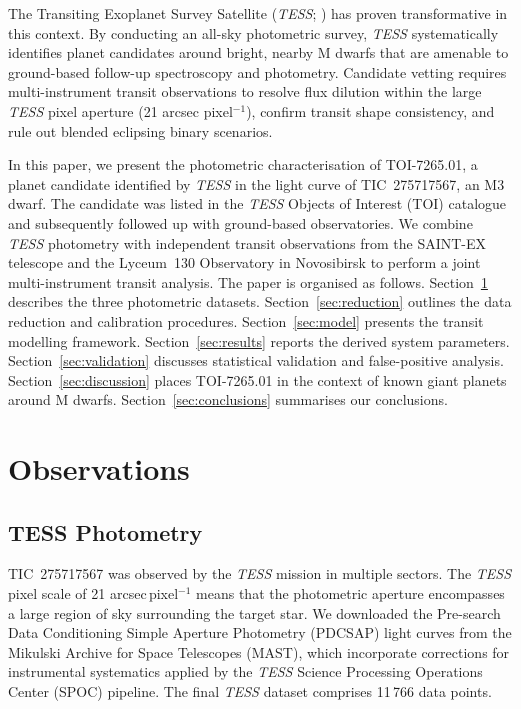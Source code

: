 \documentclass[fleqn,usenatbib]{mnras}
\newcommand{\SAINTEX}{SAINT-EX}
\begin{document}
The Transiting Exoplanet Survey Satellite (\textit{TESS}; \citealt{ricker2015}) has proven transformative in this context. By conducting an all-sky photometric survey, \textit{TESS} systematically identifies planet candidates around bright, nearby M dwarfs that are amenable to ground-based follow-up spectroscopy and photometry. Candidate vetting requires multi-instrument transit observations to resolve flux dilution within the large \textit{TESS} pixel aperture (21 arcsec pixel$^{-1}$), confirm transit shape consistency, and rule out blended eclipsing binary scenarios.

In this paper, we present the photometric characterisation of TOI-7265.01, a planet candidate identified by \textit{TESS} in the light curve of TIC~275717567, an M3 dwarf. The candidate was listed in the \textit{TESS} Objects of Interest (TOI) catalogue \citep{guerrero2021} and subsequently followed up with ground-based observatories. We combine \textit{TESS} photometry with independent transit observations from the \SAINTEX{} telescope \citep{demory2020} and the Lyceum~130 Observatory in Novosibirsk to perform a joint multi-instrument transit analysis. The paper is organised as follows. Section~\ref{sec:obs} describes the three photometric datasets. Section~\ref{sec:reduction} outlines the data reduction and calibration procedures. Section~\ref{sec:model} presents the transit modelling framework. Section~\ref{sec:results} reports the derived system parameters. Section~\ref{sec:validation} discusses statistical validation and false-positive analysis. Section~\ref{sec:discussion} places TOI-7265.01 in the context of known giant planets around M dwarfs. Section~\ref{sec:conclusions} summarises our conclusions.

\section{Observations}
\label{sec:obs}

\subsection{TESS Photometry}
\label{sec:obs_tess}

TIC~275717567 was observed by the \textit{TESS} mission \citep{ricker2015} in multiple sectors. The \textit{TESS} pixel scale of 21 arcsec\,pixel$^{-1}$ means that the photometric aperture encompasses a large region of sky surrounding the target star. We downloaded the Pre-search Data Conditioning Simple Aperture Photometry (PDCSAP) light curves from the Mikulski Archive for Space Telescopes (MAST), which incorporate corrections for instrumental systematics applied by the \textit{TESS} Science Processing Operations Center (SPOC) pipeline. The final \textit{TESS} dataset comprises 11\,766 data points.
\end{document}
